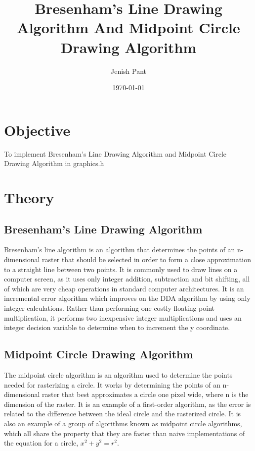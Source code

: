 \documentclass[12pt]{article}
\begin{document}
	\title{Bresenham's Line Drawing Algorithm And Midpoint Circle Drawing Algorithm}
	\author{Jenish Pant}
	\date{\today}
	\maketitle

	\section{Objective}
	To implement Bresenham's Line Drawing Algorithm and Midpoint Circle Drawing Algorithm in graphics.h
	\section{Theory}
	\subsection{Bresenham's Line Drawing Algorithm}
	Bresenham's line algorithm is an algorithm that determines the points of an n-dimensional raster that should be selected in order to form a close approximation to a straight line between two points. It is commonly used to draw lines on a computer screen, as it uses only integer addition, subtraction and bit shifting, all of which are very cheap operations in standard computer architectures.
	It is an incremental error algorithm which improves on the DDA algorithm by using only integer calculations. Rather than performing one costly floating point multiplication, it performs two inexpensive integer multiplications and uses an integer decision variable to determine when to increment the y coordinate.\\
	\subsection{Midpoint Circle Drawing Algorithm}
	The midpoint circle algorithm is an algorithm used to determine the points needed for rasterizing a circle.
	It works by determining the points of an n-dimensional raster that best approximates a circle one pixel wide, where n is the dimension of the raster. It is an example of a first-order algorithm, as the error is related to the difference between the ideal circle and the rasterized circle. It is also an example of a group of algorithms known as midpoint circle algorithms, which all share the property that they are faster than naive implementations of the equation for a circle, $x^2 + y^2 = r^2$.\\
		
\end{document}
